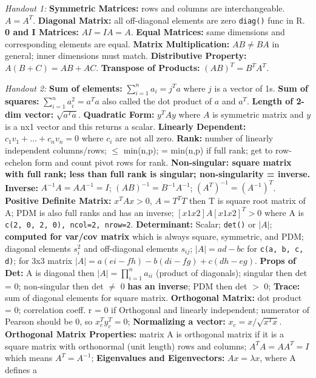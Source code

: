 \documentclass[9pt]{extarticle}
\begin{document}
 
\textit{Handout 1:} \textbf{Symmetric Matrices:} rows and columns are 
interchangeable. $A = A^T$. 
\textbf{Diagonal Matrix:} all off-diagonal elements are zero \texttt{diag()} 
func in R. 
\textbf{0 and I Matrices:} $AI = IA = A$.
\textbf{Equal Matrices:} same dimensions and corresponding elements are equal.
\textbf{Matrix Multiplication:} $AB \neq BA$ in general; inner dimensions must
match.
\textbf{Distributive Property:} $A(B + C) = AB + AC$.
\textbf{Transpose of Products:} $(AB)^T = B^TA^T$.

\textit{Handout 2:}
\textbf{Sum of elements:} $\sum_{i=1}^n a_i = j^Ta$ where $j$ is a vector of 1s.
\textbf{Sum of squares:} $\sum_{i=1}^n a_i^2 = a^Ta$ also called the dot
product of $a$ and $a^T$.
\textbf{Length of 2-dim vector:} $\sqrt{a^Ta}$.
\textbf{Quadratic Form:} $y^TAy$ where $A$ is symmetric matrix and $y$ is a nx1
vector and this returns a scalar.
\textbf{Linearly Dependent:} $c_1v_1 + \ldots + c_nv_n = 0$ where $c_i$ 
are not all zero.
\textbf{Rank:} number of linearly independent columns/rows; $\leq$ min(n,p);
= min(n,p) if full rank; get to row-echelon form and count pivot rows for rank.
\textbf{Non-singular: square matrix with full rank; less than full rank is
singular; non-singularity = inverse.}
\textbf{Inverse:} $A^{-1}A = AA^{-1}= I$; $(AB)^{-1} = B^{-1}A^{-1}$; $(A^T)^
{-1} = (A^{-1})^T$.
\textbf{Positive Definite Matrix:} $x^TAx > 0$, $A = T^TT$ then T is square root
matrix of A; PDM is also full ranks and has an inverse; $[x1 x2]A[x1 x2]^T > 0$ 
where A is \texttt{c(2, 0, 2, 0), ncol=2, nrow=2}.
\textbf{Determinant:} Scalar; \texttt{det()} or $|A|$; \textbf{computed for 
var/cov  matrix} which is always square, symmetric, and PDM; diagonal 
elements $s_i^2$ and off-diagonal elements $s_{ij}$; $|A| = ad - bc$ for
\texttt{c(a, b, c, d)}; for 3x3 matrix $|A| = a(ei - fh) - b(di - fg) + 
c(dh - eg)$.
\textbf{Props of Det:} A is diagonal then $|A| = \prod_{i=1}^n a_{ii}$ (product
of diagonals); singular then det = 0; non-singular then det $\neq$ 0 \textbf{has
an inverse}; PDM then
det $>$ 0;
\textbf{Trace:} sum of diagonal elements for square matrix.
\textbf{Orthogonal Matrix:} dot product = 0; correlation coeff. r = 0 if 
Orthogonal and linearly independent; numerator of Pearson should be 0, so 
$x_c^Ty_c^T = 0$;
\textbf{Normalizing a vector:} $x_c = x/\sqrt{x^Tx}$.
\textbf{Orthogonal Matrix Properties:} matrix A is orthogonal matrix if it is 
a square matrix with orthonormal (unit length) rows and columns; $A^TA = AA^T 
= I$ which means $A^T = A^{-1}$;
\textbf{Eigenvalues and Eigenvectors:} $Ax = \lambda x$, where A defines a 
\end{document}
